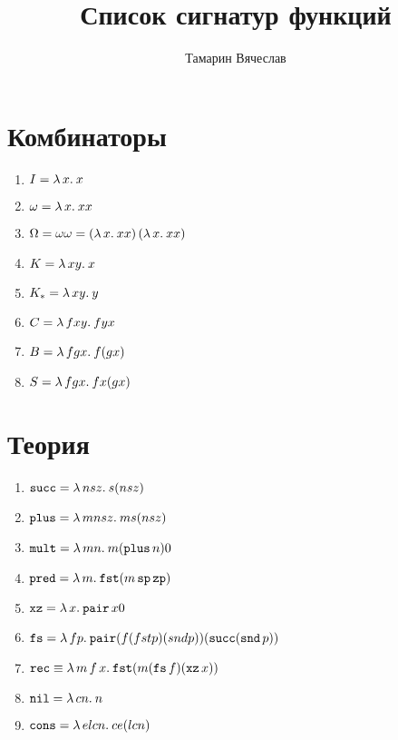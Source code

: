\documentclass[11pt,a4paper]{article}
\title{Список сигнатур функций}
\author{Тамарин Вячеслав}
\begin{document}

\begin{minipage}{0.47\textwidth}
\section{Комбинаторы}
\begin{enumerate}[noitemsep]
	\item $ I = \lam{x}{x}$
	\item $ \omega = \lam{x} {x x}$
	\item $ \Omega = \omega \omega = \left( \lam{x}{x x} \right) \left( \lam{x}{x x} \right) $
	\item $ K = \lam{x y} {x}$
	\item  $ K_{*} = \lam{x y}{y}$
	\item $ C = \lam{f x y}{f y x}$ 
	\item $ B = \lam{f g x}{f (g x)}$
	\item $ S = \lam{f g x}{f x (g x)}$
\end{enumerate} 
\end{minipage}
\hfill
\begin{minipage}{0.47\textwidth}
\section{Теория}
\begin{enumerate}[noitemsep]
    \item $ \fpsucc = \lam{nsz}{s(nsz)}$ 
	\item $ \plus = \lam{mnsz}{ms(nsz)}$
	\item $ \fpmult = \lam{mn}{m(\plus n)0}$ 
	\item $ \pred = \lam{m}{\fst (m \fpsp \zp)}$
	\item  $ \fpxz = \lam{x}{\pair x 0}$
	\item  $ \fpfs = \lam{fp}{\pair(f(fst p)(snd p))(\fpsucc (\snd p))}$
	\item $ \fprec  \equiv \lam{m\,f\,x}{\fst (m (\fpfs f) (\fpxz x))}$
	\item $ \nil = \lam{c n}{n}$
	\item  $ \cons = \lam{e l c n}{c e (l c n)}$
\end{enumerate} 
\end{minipage}
\end{document}
